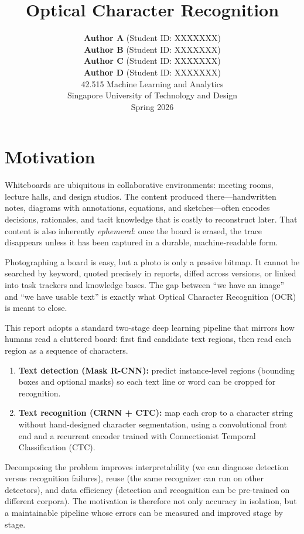 \documentclass[11pt, a4paper]{article}
\title{
  \textbf{Optical Character Recognition} \\[0.3em]
}
\author{
  \textbf{Author A} \quad (Student ID: XXXXXXX) \\
  \textbf{Author B} \quad (Student ID: XXXXXXX) \\
  \textbf{Author C} \quad (Student ID: XXXXXXX) \\
  \textbf{Author D} \quad (Student ID: XXXXXXX) \\[1em]
  \normalsize 42.515 Machine Learning and Analytics \\
  \normalsize Singapore University of Technology and Design \\
  \normalsize Spring 2026
}
\begin{document}
\maketitle
\newpage

\tableofcontents
\newpage

\section{Motivation}

Whiteboards are ubiquitous in collaborative environments: meeting rooms, lecture halls, and design studios. The content produced there---handwritten notes, diagrams with annotations, equations, and sketches---often encodes decisions, rationales, and tacit knowledge that is costly to reconstruct later. That content is also inherently \emph{ephemeral}: once the board is erased, the trace disappears unless it has been captured in a durable, machine-readable form.

Photographing a board is easy, but a photo is only a passive bitmap. It cannot be searched by keyword, quoted precisely in reports, diffed across versions, or linked into task trackers and knowledge bases. The gap between ``we have an image'' and ``we have usable text'' is exactly what Optical Character Recognition (OCR) is meant to close.

This report adopts a standard two-stage deep learning pipeline that mirrors how humans read a cluttered board: first find candidate text regions, then read each region as a sequence of characters.
\begin{enumerate}[label=\arabic*.]
  \item \textbf{Text detection (Mask R-CNN):} predict instance-level regions (bounding boxes and optional masks) so each text line or word can be cropped for recognition.
  \item \textbf{Text recognition (CRNN + CTC):} map each crop to a character string without hand-designed character segmentation, using a convolutional front end and a recurrent encoder trained with Connectionist Temporal Classification (CTC).
\end{enumerate}
Decomposing the problem improves interpretability (we can diagnose detection versus recognition failures), reuse (the same recognizer can run on other detectors), and data efficiency (detection and recognition can be pre-trained on different corpora). The motivation is therefore not only accuracy in isolation, but a maintainable pipeline whose errors can be measured and improved stage by stage.
\end{document}
